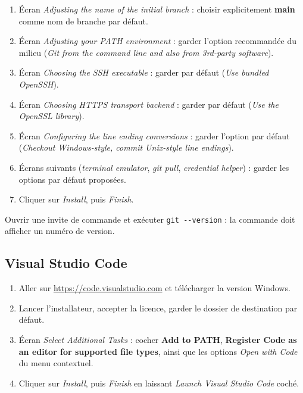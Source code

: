 \documentclass[a4paper,11pt]{article}
\begin{document}
\begin{enumerate}[resume]
  \item Écran \textit{Adjusting the name of the initial branch} : choisir explicitement \textbf{main} comme nom de branche par défaut.
  \item Écran \textit{Adjusting your PATH environment} : garder l'option recommandée du milieu (\textit{Git from the command line and also from 3rd-party software}).
  \item Écran \textit{Choosing the SSH executable} : garder par défaut (\textit{Use bundled OpenSSH}).
  \item Écran \textit{Choosing HTTPS transport backend} : garder par défaut (\textit{Use the OpenSSL library}).
  \item Écran \textit{Configuring the line ending conversions} : garder l'option par défaut (\textit{Checkout Windows-style, commit Unix-style line endings}).
  \item Écrans suivants (\textit{terminal emulator}, \textit{git pull}, \textit{credential helper}) : garder les options par défaut proposées.
  \item Cliquer sur \textit{Install}, puis \textit{Finish}.
\end{enumerate}

\begin{tcolorbox}[attention, title={Vérification}]
Ouvrir une invite de commande et exécuter \texttt{git -{}-version} : la commande doit afficher un numéro de version.
\end{tcolorbox}

\subsection{Visual Studio Code}

\begin{enumerate}
  \item Aller sur \url{https://code.visualstudio.com} et télécharger la version Windows.
  \item Lancer l'installateur, accepter la licence, garder le dossier de destination par défaut.
  \item Écran \textit{Select Additional Tasks} : cocher \textbf{Add to PATH}, \textbf{Register Code as an editor for supported file types}, ainsi que les options \textit{Open with Code} du menu contextuel.
  \item Cliquer sur \textit{Install}, puis \textit{Finish} en laissant \textit{Launch Visual Studio Code} coché.
\end{enumerate}
\end{document}
